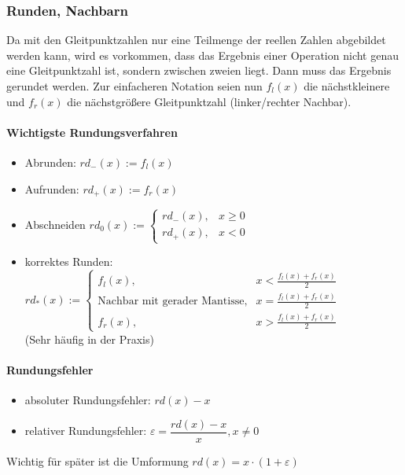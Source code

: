 			
			\subsubsection{Runden, Nachbarn}
				Da mit den Gleitpunktzahlen nur eine Teilmenge der reellen Zahlen abgebildet werden kann, wird es vorkommen, dass das Ergebnis einer Operation nicht genau eine Gleitpunktzahl ist, sondern zwischen zweien liegt. Dann	muss das Ergebnis gerundet werden. Zur einfacheren Notation seien nun $ f_l(x) $ die nächstkleinere und $ f_r(x) $ die nächstgrößere Gleitpunktzahl (linker/rechter Nachbar).
				
				\paragraph{Wichtigste Rundungsverfahren}
					\begin{itemize}
						\item Abrunden: $ rd_{-}(x) := f_l(x) $
						\item Aufrunden: $ rd_{+}(x) := f_r(x) $
						\item Abschneiden $ rd_0(x) := \begin{cases}
						rd_-(x), & x\geq 0\\
						rd_+(x), & x < 0
						\end{cases} $
						\item korrektes Runden: $ rd_*(x) := \begin{cases}
						f_l(x), & x < \frac{f_l(x) + f_r(x)}{2}\\
						\text{Nachbar mit gerader Mantisse,} & x = \frac{f_l(x) + f_r(x)}{2}\\
						f_r(x), & x > \frac{f_l(x) + f_r(x)}{2}
						\end{cases} $\\ (Sehr häufig in der Praxis)
					\end{itemize}
				
				\paragraph{Rundungsfehler}
					\begin{itemize}
						\item absoluter Rundungsfehler: $ rd(x) - x $
						\item relativer Rundungsfehler: $ \varepsilon = \dfrac{rd(x)-x}{x} , x \neq 0$
					\end{itemize}
					Wichtig für später ist die Umformung $ rd(x) = x \cdot (1+\varepsilon) $ \Biglb
					
